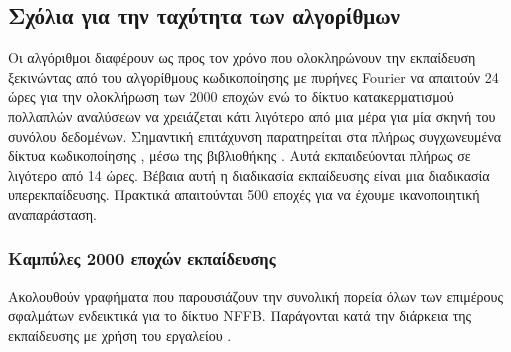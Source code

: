 \subsection{Σχόλια για την ταχύτητα των αλγορίθμων}
\par
      Οι αλγόριθμοι διαφέρουν ως προς τον χρόνο που ολοκληρώνουν την εκπαίδευση ξεκινώντας από του αλγορίθμους  κωδικοποίησης με πυρήνες Fourier να απαιτούν 24 ώρες για την ολοκλήρωση των 2000 εποχών ενώ το δίκτυο κατακερματισμού πολλαπλών αναλύσεων  να χρειάζεται κάτι λιγότερο από μια μέρα για μία σκηνή του συνόλου δεδομένων. Σημαντική επιτάχυνση παρατηρείται στα πλήρως συγχωνευμένα δίκτυα κωδικοποίησης , μέσω της βιβλιοθήκης . Αυτά εκπαιδεύονται πλήρως σε λιγότερο από 14 ώρες.  Βέβαια αυτή η διαδικασία εκπαίδευσης είναι μια διαδικασία υπερεκπαίδευσης. Πρακτικά απαιτούνται 500 εποχές για να έχουμε ικανοποιητική αναπαράσταση.
 \subsubsection{Καμπύλες 2000 εποχών εκπαίδευσης}
    Ακολουθούν γραφήματα που παρουσιάζουν την συνολική πορεία όλων των επιμέρους σφαλμάτων ενδεικτικά για το δίκτυο NFFB. Παράγονται κατά την διάρκεια της εκπαίδευσης με χρήση του εργαλείου .

